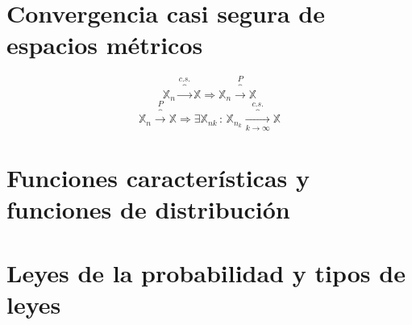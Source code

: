 \documentclass[12pt,a4paper]{book}
\begin{document}
\section{Convergencia casi segura de espacios métricos}
\begin{theorem}
$$\mathbb{X}_n\overbrace{\longrightarrow}^{c.s.}\mathbb{X}\Longrightarrow \mathbb{X}_n\overbrace{\longrightarrow}^P\mathbb{X}$$
$$\mathbb{X}_n\overbrace{\longrightarrow}^P\mathbb{X}\Longrightarrow \exists\mathbb{X}_{nk}\,:\, \mathbb{X}_{n_k}\overbrace{\longrightarrow}^{c.s.}_{k\rightarrow\infty}\mathbb{X}$$
\end{theorem}
\section{Funciones características y funciones de distribución}
\section{Leyes de la probabilidad y tipos de leyes}
\end{document}
